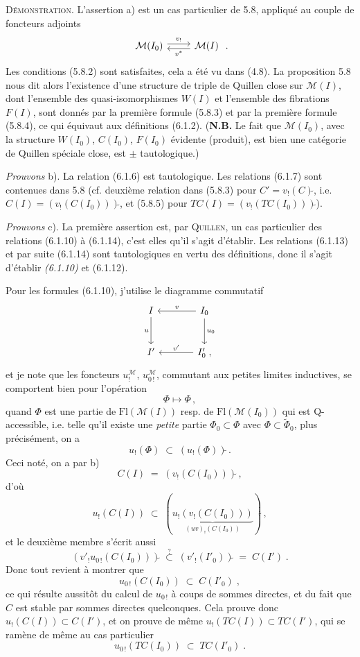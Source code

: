 \documentclass[11pt]{article}
\newcommand{\printedpage}[1]{\marginpar{\footnotesize p.~#1}}
\newcommand{\msp}[1]{\marginpar{\footnotesize [#1]}}
\newcommand{\tl}{\tilde{}}
\newcommand{\Fl}{\mathrm{Fl}}
\begin{document}
\textsc{Démonstration}. L'assertion a) est un cas particulier de 5.8, appliqué au couple de foncteurs adjoints
\[
\begin{tikzcd}
\mathcal{M}(I_0) \arrow[r, shift left, "v_!"] & \mathcal{M}(I) \arrow[l, shift left, "v^{*}"]
\end{tikzcd}
\;.
\]
Les conditions (5.8.2) sont satisfaites, cela a été vu dans (4.8). La proposition 5.8 nous dit alors l'existence d'une structure de triple de Quillen close sur $\mathcal{M}(I)$, dont l'ensemble des quasi-isomorphismes $W(I)$ et l'ensemble des fibrations $F(I)$, sont donnés par la première formule (5.8.3) et par la première formule (5.8.4), ce qui équivaut aux définitions (6.1.2). (\textbf{N.B.} Le fait que $\mathcal{M}(I_0)$, avec la structure $W(I_0)$, $C(I_0)$, $F(I_0)$ évidente (produit), est
\printedpage{51}
\msp{page 102}
bien une catégorie de Quillen spéciale close, est $\pm$ tautologique.)

\textit{Prouvons} b). La relation (6.1.6) est tautologique. Les relations (6.1.7) sont contenues dans 5.8 (cf. deuxième relation dans (5.8.3) pour $C' = v_!(C)\tl$, i.e. $C(I) = (v_!(C(I_0)))\tl$, et (5.8.5) pour $TC(I) = (v_!(TC(I_0)))\tl$).

\textit{Prouvons} c). La première assertion est, par \textsc{Quillen}, un cas particulier des relations (6.1.10) à (6.1.14), c'est elles qu'il s'agit d'établir. Les relations (6.1.13) et par suite (6.1.14) sont tautologiques en vertu des définitions, donc il s'agit d'établir \textit{(6.1.10)} et (6.1.12).

Pour les formules (6.1.10), j'utilise le diagramme commutatif
\[
\begin{tikzcd}[row sep=large, column sep=large]
I \arrow[d, "u"'] & I_0 \arrow[l, "v"'] \arrow[d, "u_0"] \\
I' & I'_0\;, \arrow[l, "v'"']
\end{tikzcd}
\]
et je note que les foncteurs $u_!^{\mathcal{M}}$, $u_{0\,!}^{\mathcal{M}}$, commutant aux petites limites inductives, se
\msp{page 103}
comportent bien pour l'opération
\[
\Phi \longmapsto \Phi\tl\,,
\]
quand $\Phi$ est une partie de $\Fl(\mathcal{M}(I))$ resp. de $\Fl(\mathcal{M}(I_0))$ qui est Q-accessible, i.e. telle qu'il existe une \textit{petite} partie $\Phi_0 \subset \Phi$ avec $\Phi \subset \tilde{\Phi}_0$, plus précisément, on a
\[
u_!(\Phi\tl) \;\subset\; (u_!(\Phi))\tl\,.
\]
Ceci noté, on a par b)
\[
C(I) \;=\; (v_!(C(I_0)))\tl\,,
\]
d'où
\[
u_!(C(I)) \;\subset\; (\underbrace{u_!(v_!(C(I_0)))}_{(uv)_!(C(I_0))})\tl\,,
\]
et le deuxième membre s'écrit aussi
\[
(v'_!u_{0\,!}(C(I_0)))\tl \;\overset{?}{\subset}\; (v'_!(I'_0))\tl \;=\; C(I')\;. %
\]
Donc tout revient à montrer que
\[
u_{0\,!}(C(I_0)) \;\subset\; C(I'_0)\;,
\tag*{(6.1.16)}
\]
ce qui résulte aussitôt du calcul de $u_{0\,!}$ à coups de sommes directes, et du fait que $C$ est stable par sommes directes quelconques. Cela prouve donc $u_!(C(I)) \subset C(I')$, et on prouve de même $u_!(TC(I)) \subset TC(I')$, qui se ramène de même au cas particulier
\[
u_{0\,!}(TC(I_0)) \;\subset\; TC(I'_0)\;.
\tag*{(6.1.17)}
\]
\end{document}
